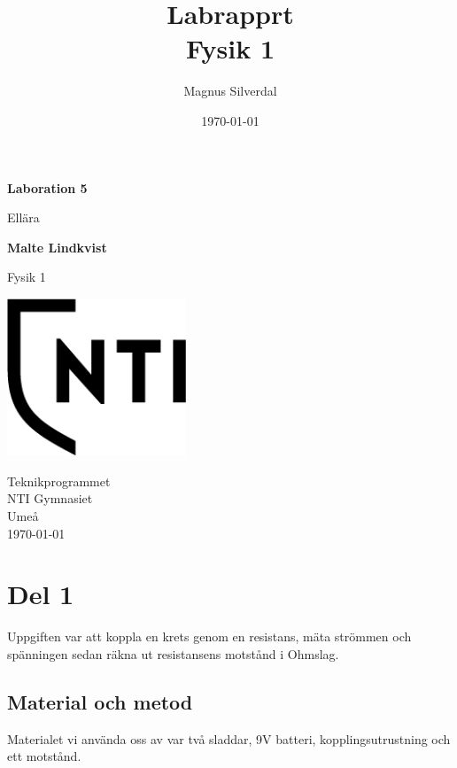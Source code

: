 \documentclass[11p]{article}
\title{Labrapprt \\ \small Fysik 1}
\author{Magnus Silverdal }
\date{\today}
\begin{document}
    \begin{titlepage}
        \begin{center}
            \vspace*{1cm}

            \Huge
            \textbf{Laboration 5}

            \vspace{0.5cm}
            \LARGE
            Ellära

            \vspace{1.5cm}

            \textbf{Malte Lindkvist}

            \vfill


            Fysik 1

            \vspace{0.8cm}

            \includegraphics[width=0.4\textwidth]{../images/NTI Gymnasiet_Symbol_print_svart.png}

            \Large
            Teknikprogrammet\\
            NTI Gymnasiet\\
            Umeå\\
            \today

        \end{center}
    \end{titlepage}
    \section{Del 1}
    Uppgiften var att koppla en krets genom en resistans, mäta strömmen och spänningen sedan räkna ut resistansens motstånd i Ohmslag.
    \subsection{Material och metod}
    Materialet vi använda oss av var två sladdar, 9V batteri, kopplingsutrustning och ett motstånd.
\end{document}
